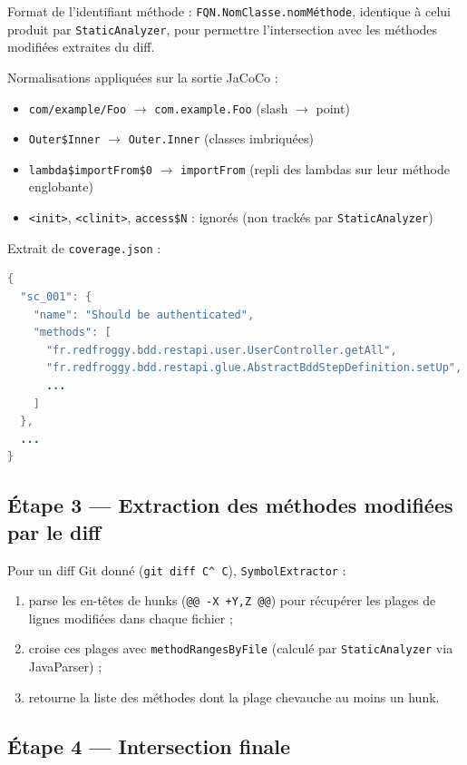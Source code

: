 \documentclass[11pt,a4paper]{article}
\begin{document}
Format de l'identifiant méthode : \texttt{FQN.NomClasse.nomMéthode}, identique à celui produit par \texttt{StaticAnalyzer}, pour permettre l'intersection avec les méthodes modifiées extraites du diff.

Normalisations appliquées sur la sortie JaCoCo :
\begin{itemize}
  \item \texttt{com/example/Foo} \(\rightarrow\) \texttt{com.example.Foo} (slash \(\rightarrow\) point)
  \item \texttt{Outer\$Inner} \(\rightarrow\) \texttt{Outer.Inner} (classes imbriquées)
  \item \texttt{lambda\$importFrom\$0} \(\rightarrow\) \texttt{importFrom} (repli des lambdas sur leur méthode englobante)
  \item \texttt{<init>}, \texttt{<clinit>}, \texttt{access\$N} : ignorés (non trackés par \texttt{StaticAnalyzer})
\end{itemize}

Extrait de \texttt{coverage.json} :

\begin{lstlisting}[language=Java]
{
  "sc_001": {
    "name": "Should be authenticated",
    "methods": [
      "fr.redfroggy.bdd.restapi.user.UserController.getAll",
      "fr.redfroggy.bdd.restapi.glue.AbstractBddStepDefinition.setUp",
      ...
    ]
  },
  ...
}
\end{lstlisting}

\subsection{Étape 3 --- Extraction des méthodes modifiées par le diff}

Pour un diff Git donné (\texttt{git diff C\^{} C}), \texttt{SymbolExtractor} :

\begin{enumerate}
  \item parse les en-têtes de hunks (\texttt{@@ -X +Y,Z @@}) pour récupérer les plages de lignes modifiées dans chaque fichier ;
  \item croise ces plages avec \texttt{methodRangesByFile} (calculé par \texttt{StaticAnalyzer} via JavaParser) ;
  \item retourne la liste des méthodes dont la plage chevauche au moins un hunk.
\end{enumerate}

\subsection{Étape 4 --- Intersection finale}
\end{document}
